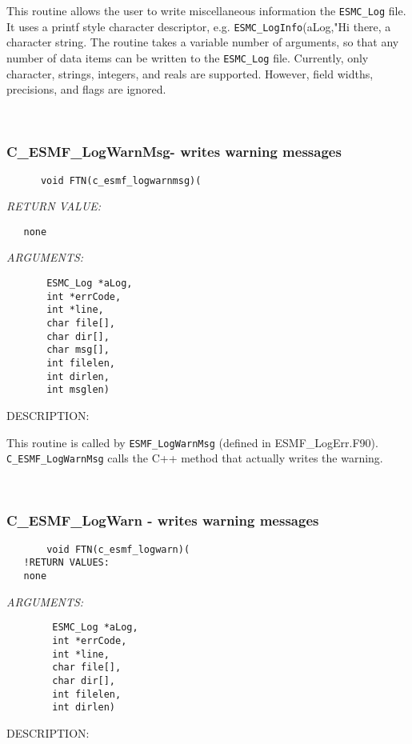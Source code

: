     This routine allows the user to write miscellaneous information the
    {\tt ESMC\_Log} file. It uses a printf style character descriptor, e.g. 
    {\tt ESMC\_LogInfo}(aLog,"Hi there, %
    a character string. The routine takes a variable number of arguments,
    so that any number of data items can be written to the {\tt ESMC\_Log} file.
    Currently, only character, strings, integers, and reals are supported.
    However, field widths, precisions, and flags are ignored.
   
 
\mbox{}\hrulefill\ 
 
\subsubsection [C\_ESMF\_LogWarnMsg-] {C\_ESMF\_LogWarnMsg- writes warning messages}


  
\begin{verbatim}      void FTN(c_esmf_logwarnmsg)(\end{verbatim}{\em RETURN VALUE:}
\begin{verbatim}   none\end{verbatim}{\em ARGUMENTS:}
\begin{verbatim}       ESMC_Log *aLog,
       int *errCode,
       int *line,
       char file[],
       char dir[],
       char msg[],
       int filelen,
       int dirlen,
       int msglen)\end{verbatim}
{\sf DESCRIPTION:\\ }


      This routine is called by {\tt ESMF\_LogWarnMsg} (defined in ESMF\_LogErr.F90).  
      {\tt C\_ESMF\_LogWarnMsg} calls the C++ method that actually writes the warning.
   
 
\mbox{}\hrulefill\ 
 
\subsubsection [C\_ESMF\_LogWarn] {C\_ESMF\_LogWarn - writes warning messages}


  
\begin{verbatim}       void FTN(c_esmf_logwarn)(
   !RETURN VALUES:
   none\end{verbatim}{\em ARGUMENTS:}
\begin{verbatim}        ESMC_Log *aLog,
        int *errCode,
        int *line,
        char file[],
        char dir[],
        int filelen,
        int dirlen)\end{verbatim}
{\sf DESCRIPTION:\\ }


